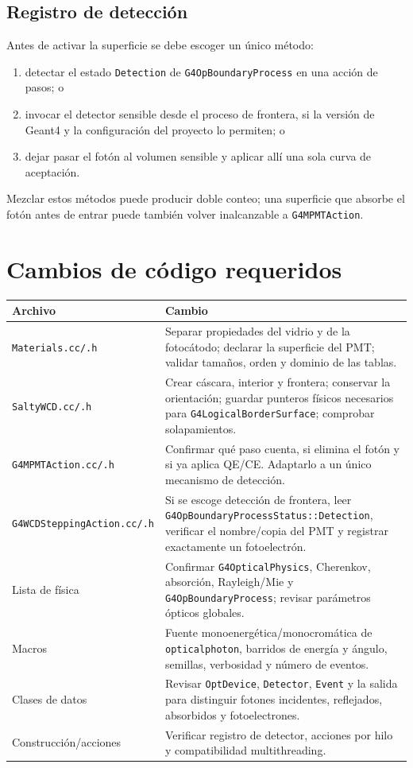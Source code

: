 \documentclass[11pt,a4paper]{article}
\begin{document}
\subsection{Registro de detección}
Antes de activar la superficie se debe escoger un único método:
\begin{enumerate}
  \item detectar el estado \texttt{Detection} de \texttt{G4OpBoundaryProcess}
  en una acción de pasos; o
  \item invocar el detector sensible desde el proceso de frontera, si la versión
  de Geant4 y la configuración del proyecto lo permiten; o
  \item dejar pasar el fotón al volumen sensible y aplicar allí una sola curva
  de aceptación.
\end{enumerate}
Mezclar estos métodos puede producir doble conteo; una superficie que absorbe
el fotón antes de entrar puede también volver inalcanzable a
\texttt{G4MPMTAction}.

\section{Cambios de código requeridos}
\begin{longtable}{p{}p{}}
\toprule
Archivo & Cambio \\
\midrule
\endhead
\texttt{Materials.cc/.h} & Separar propiedades del vidrio y de la fotocátodo;
declarar la superficie del PMT; validar tamaños, orden y dominio de las tablas. \\
\texttt{SaltyWCD.cc/.h} & Crear cáscara, interior y frontera; conservar la
orientación; guardar punteros físicos necesarios para
\texttt{G4LogicalBorderSurface}; comprobar solapamientos. \\
\texttt{G4MPMTAction.cc/.h} & Confirmar qué paso cuenta, si elimina el fotón y
si ya aplica QE/CE. Adaptarlo a un único mecanismo de detección. \\
\texttt{G4WCDSteppingAction.cc/.h} & Si se escoge detección de frontera, leer
\texttt{G4OpBoundaryProcessStatus::Detection}, verificar el nombre/copia del PMT
y registrar exactamente un fotoelectrón. \\
Lista de física & Confirmar \texttt{G4OpticalPhysics}, Cherenkov, absorción,
Rayleigh/Mie y \texttt{G4OpBoundaryProcess}; revisar parámetros ópticos globales. \\
Macros & Fuente monoenergética/monocromática de \texttt{opticalphoton}, barridos
de energía y ángulo, semillas, verbosidad y número de eventos. \\
Clases de datos & Revisar \texttt{OptDevice}, \texttt{Detector}, \texttt{Event}
y la salida para distinguir fotones incidentes, reflejados, absorbidos y
fotoelectrones. \\
Construcción/acciones & Verificar registro de detector, acciones por hilo y
compatibilidad multithreading. \\
\bottomrule
\end{longtable}
\end{document}
